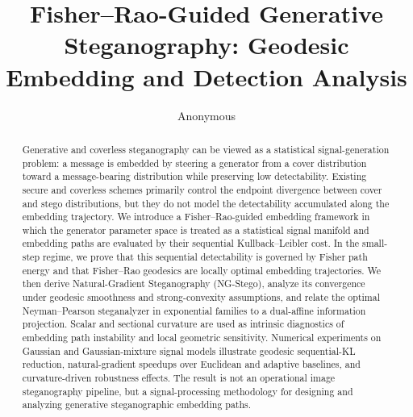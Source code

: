 \documentclass[a4paper,fleqn]{cas-dc}
\begin{document}
\let\WriteBookmarks\relax
\def\floatpagepagefraction{1}
\def\textpagefraction{.001}



\title [mode = title]{Fisher--Rao-Guided Generative Steganography: Geodesic Embedding and Detection Analysis}  



%

\author{Anonymous}
\begin{abstract}
Generative and coverless steganography can be viewed as a statistical
signal-generation problem: a message is embedded by steering a generator from a
cover distribution toward a message-bearing distribution while preserving low
detectability. Existing secure and coverless schemes primarily control the
endpoint divergence between cover and stego distributions, but they do not model
the detectability accumulated along the embedding trajectory. We introduce a
Fisher--Rao-guided embedding framework in which the generator parameter space is
treated as a statistical signal manifold and embedding paths are evaluated by
their sequential Kullback--Leibler cost. In the small-step regime, we prove that
this sequential detectability is governed by Fisher path energy and that
Fisher--Rao geodesics are locally optimal embedding trajectories. We then derive
Natural-Gradient Steganography (NG-Stego), analyze its convergence under
geodesic smoothness and strong-convexity assumptions, and relate the optimal
Neyman--Pearson steganalyzer in exponential families to a dual-affine
information projection. Scalar and sectional curvature are used as intrinsic diagnostics of embedding
path instability and local geometric sensitivity. Numerical
experiments on Gaussian and Gaussian-mixture signal models illustrate
geodesic sequential-KL reduction, natural-gradient speedups over Euclidean and
adaptive baselines, and curvature-driven robustness effects. The result is not an operational image
steganography pipeline, but a signal-processing methodology for designing and
analyzing generative steganographic embedding paths.
\end{abstract}
\end{document}
